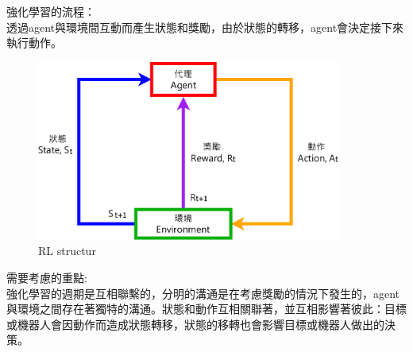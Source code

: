 \documentclass[14pt,a4paper]{report}  %
\begin{document}
強化學習的流程：\\[6pt]
透過agent與環境間互動而產生狀態和獎勵，由於狀態的轉移，agent會決定接下來執行動作。\\[12pt]

\begin{figure}[hbt!]
\begin{center}
\includegraphics[width=10cm]{The_Flow_of_Reinforcement_Learning}
\caption{RL structur}
\end{center}
\end{figure}
需要考慮的重點:\\[6pt]
\qquad 強化學習的週期是互相聯繫的，分明的溝通是在考慮獎勵的情況下發生的，agent與環境之間存在著獨特的溝通。狀態和動作互相關聯著，並互相影響著彼此：目標或機器人會因動作而造成狀態轉移，狀態的移轉也會影響目標或機器人做出的決策。
\end{document}
